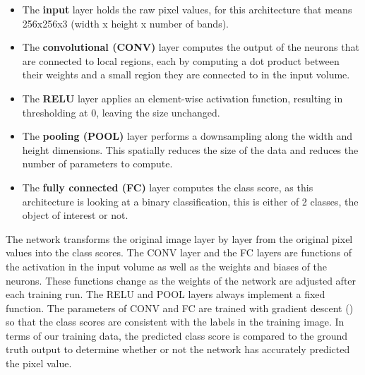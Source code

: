 \begin{itemize}
    
    \item The \textbf{input} layer holds the raw pixel values, for this architecture that means 256x256x3 (width x height x number of bands).
    \item The \textbf{convolutional (CONV)} layer computes the output of the neurons that are connected to local regions, each by computing a dot product between their weights and a small region they are connected to in the input volume.
    \item The \textbf{RELU} layer applies an element-wise activation function, resulting in thresholding at 0, leaving the size unchanged.
    \item The \textbf{pooling (POOL)} layer performs a downsampling along the width and height dimensions. This spatially reduces the size of the data and reduces the number of parameters to compute.
    \item The \textbf{fully connected (FC)} layer computes the class score, as this architecture is looking at a binary classification, this is either of 2 classes, the object of interest or not. 
\end{itemize}
\par
The network transforms the original image layer by layer from the original pixel values into the class scores. The CONV layer and the FC layers are functions of the activation in the input volume as well as the weights and biases of the neurons. These functions change as the weights of the network are adjusted after each training run. The RELU and POOL layers always implement a fixed function. The parameters of CONV and FC are trained with gradient descent (\cite{Bottou98,Sutskever13}) so that the class scores are consistent with the labels in the training image. In terms of our training data, the predicted class score is compared to the ground truth output to determine whether or not the network has accurately predicted the pixel value.
\par

